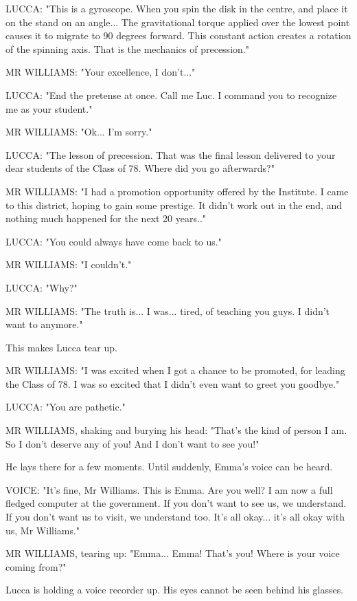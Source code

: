\documentclass[11pt]{article}
\begin{document}
LUCCA: "This is a gyroscope.
When you spin the disk in the centre, and place it on the stand on an angle...
The gravitational torque applied over the lowest point causes it to migrate to 90 degrees forward.
This constant action creates a rotation of the spinning axis.
That is the mechanics of precession."

MR WILLIAMS: "Your excellence, I don't..."

LUCCA: "End the pretense at once. Call me Luc. I command you to recognize me as your student."

MR WILLIAMS: "Ok... I'm sorry."

LUCCA: "The lesson of precession. 
That was the final lesson delivered to your dear students of the Class of 78.
Where did you go afterwards?"

MR WILLIAMS: "I had a promotion opportunity offered by the Institute. 
I came to this district, hoping to gain some prestige.
It didn't work out in the end, and nothing much happened for the next 20 years.."

LUCCA: "You could always have come back to us."

MR WILLIAMS: "I couldn't."

LUCCA: "Why?"

MR WILLIAMS: "The truth is... I was... tired, of teaching you guys.
I didn't want to anymore."

This makes Lucca tear up.

MR WILLIAMS: "I was excited when I got a chance to be promoted, for leading the Class of 78.
I was so excited that I didn't even want to greet you goodbye."

LUCCA: "You are pathetic."

MR WILLIAMS, shaking and burying his head: "That's the kind of person I am.
So I don't deserve any of you!
And I don't want to see you!"

He lays there for a few moments. 
Until suddenly, Emma's voice can be heard. 

VOICE: "It's fine, Mr Williams. 
This is Emma.
Are you well? 
I am now a full fledged computer at the government.
If you don't want to see us, we understand. 
If you don't want us to visit, we understand too.
It's all okay... it's all okay with us, Mr Williams."

MR WILLIAMS, tearing up: "Emma... Emma! That's you! Where is your voice coming from?"

Lucca is holding a voice recorder up.
His eyes cannot be seen behind his glasses.
\end{document}
